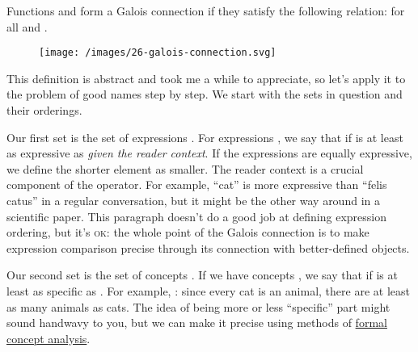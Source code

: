 \documentclass{article}
\begin{document}
Functions
and
form a Galois connection if they satisfy the following relation:
for all
and
.

\begin{figure}[grayscale-diagram,medium-size]
  \texttt{[image: /images/26-galois-connection.svg]}
\end{figure}

This definition is abstract and took me a while to appreciate,
so let's apply it to the problem of good names step by step.
We start with the sets in question and their orderings.

Our first set is the set of expressions .
For expressions
,
we say that
if  is at least as expressive as
 \emph{given the reader context}.
If the expressions are equally expressive, we define the shorter element as smaller.
The reader context is a crucial component of the \mathml{\mo{\leq}} operator.
For example, ``cat'' is more expressive than ``felis catus'' in a regular conversation,
but it might be the other way around in a scientific paper.
This paragraph doesn't do a good job at defining expression ordering,
but it's \textsc{ok}:
the whole point of the Galois connection is to make expression comparison precise through its connection with better-defined objects.

Our second set is the set of concepts .
If we have concepts
,
we say that
if 
is at least as specific as .
For example, :
since every cat is an animal,
there are at least as many animals as cats.
The idea of being more or less ``specific'' part might sound handwavy to you,
but we can make it precise using methods of \href{https://en.wikipedia.org/wiki/Formal_concept_analysis}{formal concept analysis}.
\end{document}
